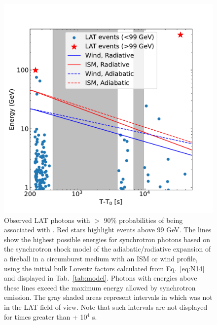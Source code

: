 \documentclass[preprint]{aastex631}
\begin{document}
\begin{figure}[t]
    \centering    
    \includegraphics[width=0.7\linewidth]{MaxSynchrotron.pdf}
    \caption{Observed LAT photons with $>$ 90\% probabilities of being associated with \grb. Red stars highlight events above 99 GeV. The lines show the highest possible energies for synchrotron photons based on the synchrotron shock model of the adiabatic/radiative expansion of a fireball in a circumburst medium with an ISM or wind profile, using the initial bulk Lorentz factors calculated from Eq.~\ref{eq:N14} and displayed in Tab.~\ref{tab:model}.
    Photons with energies above these lines exceed the maximum energy allowed by synchrotron emission.
    The gray shaded areas represent intervals in which \grb was not in the LAT field of view. Note that such intervals are not displayed for times greater than \trig + 10$^4$ s.}
    \label{fig:maximum_syn_photon}
\end{figure}
\end{document}
